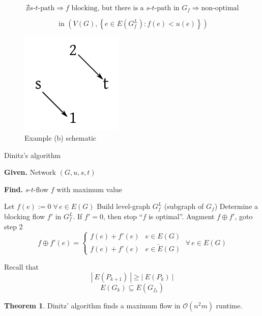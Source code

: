 \documentclass[a4paper]{article}
\theoremstyle{definition}
\newtheorem{theorem}{Theorem}
\newcommand{\card}[1]{\left|\:\!#1\:\!\right|}
\newcommand{\set}[1]{\left\{#1\right\}}
\newcommand{\given}[1]{\textbf{Given.} #1\par}
\newcommand{\find}[1]{\textbf{Find.} #1\par}
\newcommand{\gath}[2]{$#1$-$#2$-path} %
\newcommand{\fall}{\;\forall\,}
\begin{document}
\begin{itemize}
    \[
      \nexists \text{\gath st}
        \Rightarrow f \text{ blocking, but there is a \gath st in } G_f \Rightarrow \text{non-optimal}
    \]

    \[
      \text{ in } (V(G), \set{e \in E(G^L_f): f(e) < u(e)})
    \]
    \begin{figure}[!ht]
      \begin{center}
       \includegraphics{img/blocking_flows_b_in.pdf}
       \caption{Example (b) schematic}
      \end{center}
    \end{figure}
\end{itemize}


\begin{algorithm}
  \caption{Dinitz's algorithm}
  \label{dinitz-algo}
  \given{Network $(G, u, s, t)$}
  \find{$s$-$t$-flow $f$ with maximum value}
\begin{algorithmic}[1]
  \State Let $f(e) := 0 \fall e \in E(G)$
  \State Build level-graph $G^L_f$ (subgraph of $G_f$)
  \State Determine a blocking flow $f'$ in $G^L_f$. If $f' = 0$, then stop ``$f$ is optimal''.
  \State Augment $f \oplus f'$, goto step 2
  \[
    f \oplus f'(e) = \begin{cases}
      f(e) + f'(e) & e \in E(G) \\
      f(e) + f'(e) & e \in \overleftarrow{E}(G)
    \end{cases}
    \fall e \in E(G)
  \]
\end{algorithmic}
\end{algorithm}

Recall that
  \[ \card{E(P_{k+1})} \geq \card{E(P_k)} \]
  \[ E(G_k) \subseteq E(G_{f_k}) \]

\begin{theorem}\label{satz-4.7}
  Dinitz' algorithm finds a maximum flow in $\mathcal{O}(n^2m)$ runtime.
\end{theorem}
\end{document}
